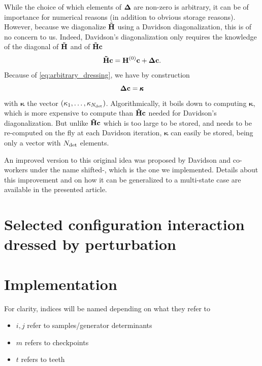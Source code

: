 \documentclass[./thesis.tex]{subfiles}
\begin{document}
While the choice of which elements of ${\bf \Delta}$ are non-zero is arbitrary, it can be of importance for numerical reasons (in addition to obvious storage reasons). However, because we diagonalize ${\bf \tilde H}$ using a Davidson diagonalization, this is of no concern to us. Indeed, Davidson's diagonalization only requires the knowledge of the diagonal of ${\bf \tilde H}$ and of ${\bf \tilde H} {\bf c}$ 
\begin{equation}
{\bf \tilde H} {\bf c} = {\bf H}^{(0)} {\bf c} + {\bf \Delta} {\bf c}.
\end{equation}
Because of \ref{eq:arbitrary_dressing}, we have by construction
\begin{equation}
{\bf \Delta} {\bf c} = {\pmb \kappa}
\end{equation}
with ${\pmb \kappa}$ the vector $\qty(\kappa_1, \ldots, \kappa_{{N_\text{det}}})$.
Algorithmically, it boils down to computing ${\pmb \kappa}$, which is more expensive to compute than ${\bf \tilde H}{\bf c}$ needed for Davidson's diagonalization. But unlike ${\bf \tilde H}{\bf c}$ which is too large to be stored, and needs to be re-computed on the fly at each Davidson iteration, ${\pmb \kappa}$ can easily be stored, being only a vector with ${N_\text{det}}$ elements.


An improved version to this original idea was proposed by Davidson and co-workers under the name shifted-\Bk,\cite{Nitzsche_1978a, Nitzsche_1978b, Rawlings_1983, Kozlowski_1995, Kozlowski_1994a, Kozlowski_1994b, Kozlowski_1994c} which is the one we implemented. Details about this improvement and on how it can be generalized to a multi-state case are available in the presented article.


\section{Selected configuration interaction dressed by perturbation}






\section{Implementation}
For clarity, indices will be named depending on what they refer to
\begin{itemize}
\item
$i,j$ refer to samples/generator determinants
\item
$m$ refers to checkpoints
\item
$t$ refers to teeth
\end{itemize}
\end{document}

